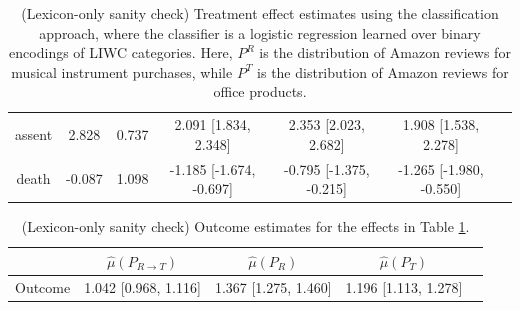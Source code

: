 \documentclass{article}
\begin{document}
\begin{table}[!ht]
\begin{tabular}{c|cccccc}
    assent      &              2.828 &              0.737 & 2.091 [1.834, 2.348]             & 2.353 [2.023, 2.682]    & 1.908 [1.538, 2.278]    \\
    death       &             -0.087 &              1.098 & -1.185 [-1.674, -0.697]          & -0.795 [-1.375, -0.215] & -1.265 [-1.980, -0.550] \\
\bottomrule
\end{tabular}
\caption{(Lexicon-only sanity check) Treatment effect estimates using the classification approach, where the classifier is a logistic regression learned over binary encodings of LIWC categories. Here, $P^R$ is the distribution of Amazon reviews for musical instrument purchases, while $P^T$ is the distribution of Amazon reviews for office products.}
\label{tab:results_clf_mpnet_amazon_synthetic_lexonly}
\end{table}

\begin{table}[!ht]
\centering
\begin{tabular}{c|cccc}
\toprule
    & $\hat{\mu}(P_{R \rightarrow T})$   & $\hat{\mu}(P_R)$     & $\hat{\mu}(P_T)$     \\
\midrule
    Outcome & 1.042 [0.968, 1.116]               & 1.367 [1.275, 1.460] & 1.196 [1.113, 1.278] \\
\bottomrule
\end{tabular}
\caption{(Lexicon-only sanity check) Outcome estimates for the effects in Table \ref{tab:results_clf_mpnet_amazon_synthetic_lexonly}.}
\label{tab:results_clf_mpnet_amazon_synthetic_lexonly_outcome}
\end{table}
\end{document}
